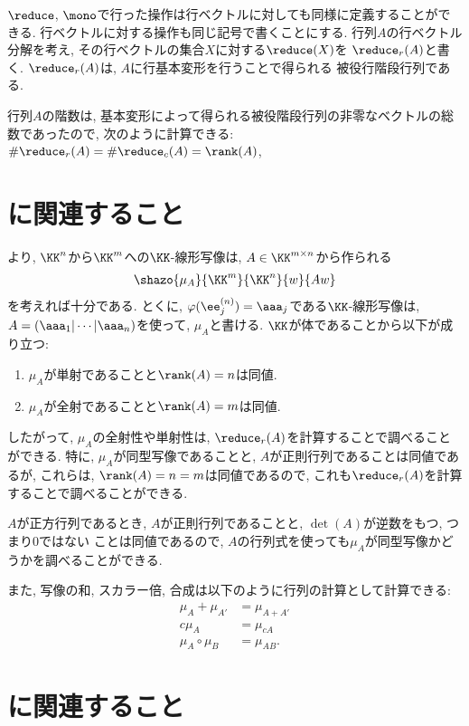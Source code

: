 $\reduce$, $\mono$で行った操作は行ベクトルに対しても同様に定義することができる.
行ベクトルに対する操作も同じ記号で書くことにする.
行列$A$の行ベクトル分解を考え,
その行ベクトルの集合$X$に対する$\reduce(X)$を
$\reduce_{r}(A)$と書く.
$\reduce_r(A)$は,
$A$に行基本変形を行うことで得られる
被役行階段行列である.

行列$A$の階数は,
基本変形によって得られる被役階段行列の非零なベクトルの総数であったので,
次のように計算できる:
$\#\reduce_r(A)=\#\reduce_c(A)=\rank(A)$,



\section{に関連すること}
より,
$\KK^n$から$\KK^m$への$\KK$-線形写像は,
$A\in \KK^{m\times n}$から作られる
\begin{align*}
  \shazo{\mu_A}{\KK^m}{\KK^n}{w}{Aw}
\end{align*}
を考えれば十分である.
とくに,
$\varphi(\ee^{(n)}_j)=\aaa_j$である$\KK$-線形写像は,
$A=(\aaa_1|\cdots|\aaa_n)$を使って,
$\mu_A$と書ける.
$\KK$が体であることから以下が成り立つ:
\begin{enumerate}
\item $\mu_A$が単射であることと$\rank(A)=n$は同値.
\item $\mu_A$が全射であることと$\rank(A)=m$は同値.
\end{enumerate}
したがって, $\mu_A$の全射性や単射性は,
$\reduce_r(A)$を計算することで調べることができる.
特に, 
$\mu_A$が同型写像であることと,
$A$が正則行列であることは同値であるが,
これらは,
$\rank(A)=n=m$は同値であるので,
これも$\reduce_r(A)$を計算することで調べることができる.
\begin{remark}
  $A$が正方行列であるとき,
  $A$が正則行列であることと,
  $\det(A)$が逆数をもつ, つまり$0$ではない
  ことは同値であるので,
  $A$の行列式を使っても$\mu_A$が同型写像かどうかを調べることができる.
\end{remark}

また,
写像の和, スカラー倍, 合成は以下のように行列の計算として計算できる:
\begin{align*}
  \mu_{A}+\mu_{A'}&=\mu_{A+A'}\\
  c\mu_{A}&=\mu_{cA}\\
  \mu_{A}\circ \mu_B&=\mu_{AB}.
\end{align*}

\section{に関連すること}

